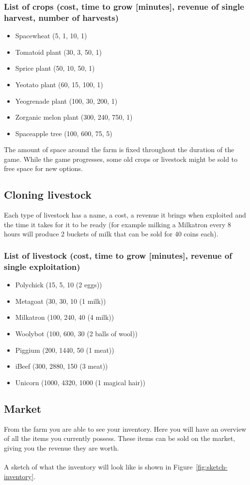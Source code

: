 \documentclass[a4paper,11pt,notitlepage]{report}
\begin{document}
\subsubsection{List of crops (cost, time to grow [minutes], revenue of single harvest, number of harvests)}
\begin{itemize}
\item Spacewheat (5, 1, 10, 1)
\item Tomatoid plant (30, 3, 50, 1)
\item Sprice plant (50, 10, 50, 1)
\item Yeotato plant (60, 15, 100, 1)
\item Yeogrenade plant (100, 30, 200, 1)
\item Zorganic melon plant (300, 240, 750, 1)
\item Spaceapple tree (100, 600, 75, 5)
\end{itemize}

The amount of space around the farm is fixed throughout the duration of the game. While the game progresses, some old crops or livestock might be sold to free space for new options.
\subsection{Cloning livestock}
Each type of livestock has a name, a cost, a revenue it brings when exploited and the time it takes for it to be ready (for example milking a Milkatron every 8 hours will produce 2 buckets of milk that can be sold for 40 coins each).

\subsubsection{List of livestock (cost, time to grow [minutes], revenue of single exploitation)}
\begin{itemize}
\item Polychick (15, 5, 10 (2 eggs))
\item Metagoat (30, 30, 10 (1 milk))
\item Milkatron (100, 240, 40 (4 milk))
\item Woolybot (100, 600, 30 (2 balls of wool))
\item Piggium (200, 1440, 50 (1 meat))
\item iBeef (300, 2880, 150 (3 meat))
\item Unicorn (1000, 4320, 1000 (1 magical hair))
\end{itemize}
\subsection{Market}
From the farm you are able to see your inventory. Here you will have an overview of all the items you currently possess. These items can be sold on the market, giving you the revenue they are worth.
\\\\
A sketch of what the inventory will look like is shown in Figure~\ref{fig:sketch-inventory}.
\end{document}
